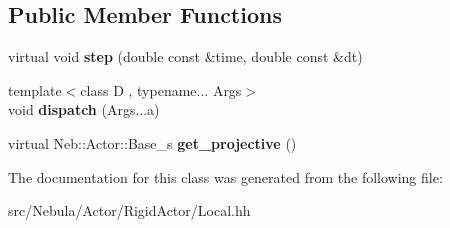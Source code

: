 \subsection*{\-Public \-Member \-Functions}
\begin{DoxyCompactItemize}
\item 
\hypertarget{classNeb_1_1Actor_1_1RigidActor_1_1Local_a43624f30987be56bd23de41628c76abd}{virtual void {\bfseries step} (double const \&time, double const \&dt)}\label{classNeb_1_1Actor_1_1RigidActor_1_1Local_a43624f30987be56bd23de41628c76abd}

\item 
\hypertarget{classNeb_1_1Actor_1_1RigidActor_1_1Local_abfd69c972ab66662b85e5b3db5569626}{{\footnotesize template$<$class D , typename... \-Args$>$ }\\void {\bfseries dispatch} (\-Args...\-a)}\label{classNeb_1_1Actor_1_1RigidActor_1_1Local_abfd69c972ab66662b85e5b3db5569626}

\item 
\hypertarget{classNeb_1_1Actor_1_1RigidActor_1_1Local_a246ff45c4c6edbed79a2747db23c3edd}{virtual \-Neb\-::\-Actor\-::\-Base\-\_\-s {\bfseries get\-\_\-projective} ()}\label{classNeb_1_1Actor_1_1RigidActor_1_1Local_a246ff45c4c6edbed79a2747db23c3edd}

\end{DoxyCompactItemize}


\-The documentation for this class was generated from the following file\-:\begin{DoxyCompactItemize}
\item 
src/\-Nebula/\-Actor/\-Rigid\-Actor/\-Local.\-hh\end{DoxyCompactItemize}
